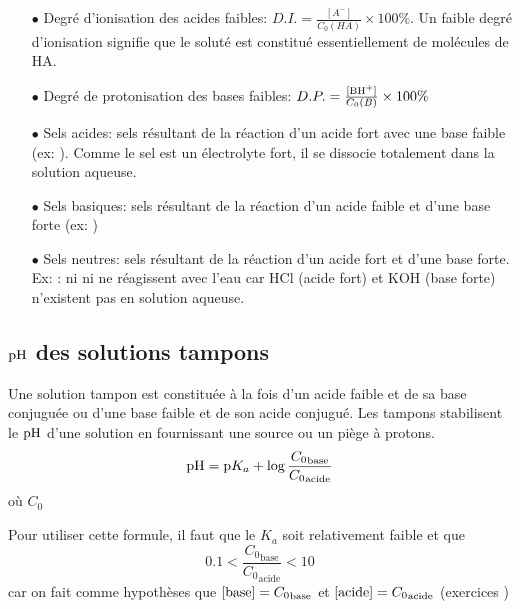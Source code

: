\begin{itemize}
\item[$\bullet$] Degré d'ionisation des acides faibles: $D.I.=\frac{[A^{-}]}{C_0(HA)}\times 100\%$.
	Un faible degré d'ionisation signifie que le soluté est constitué essentiellement de molécules de HA.

\item[$\bullet$] Degré de protonisation des bases faibles: $D.P.=\frac{[\ce{BH+}]}{C_0(B)}\times 100\%$

\item[$\bullet$] Sels acides: sels résultant de la réaction d'un acide fort avec une base faible (ex: ).
	Comme le sel est un électrolyte fort, il se dissocie totalement dans la solution aqueuse.

\item[$\bullet$] Sels basiques: sels résultant de la réaction d'un acide faible et d'une base forte (ex: )

\item[$\bullet$] Sels neutres: sels résultant de la réaction d'un acide fort et d'une base forte.
	Ex: : ni  ni  ne réagissent avec l'eau car HCl (acide fort) et KOH (base forte) n'existent pas en solution aqueuse.
\end{itemize}

\subsection{$\mathrm{pH}$ des solutions tampons}
Une solution tampon est constituée à la fois d'un acide faible et de sa base conjuguée ou d'une base faible et de son acide conjugué.
Les tampons stabilisent le $\mathrm{pH}$ d'une solution en fournissant une source ou un piège à protons.
$$\mathrm{pH} = \mathrm{p}K_a + \log{\frac{{C_0}_\mathrm{base}}{{C_0}_\mathrm{acide}}}$$
où $C_0$

Pour utiliser cette formule, il faut que le $K_a$ soit relativement faible et que
$$0.1<\frac{{C_0}_\mathrm{base}}{{C_0}_\mathrm{acide}}<10$$
car on fait comme hypothèses que $[\ce{base}]={C_0}_\mathrm{base}$ et $\ce{[acide]}={C_0}_\mathrm{acide}$
(exercices \cite[p.~38]{godard})

